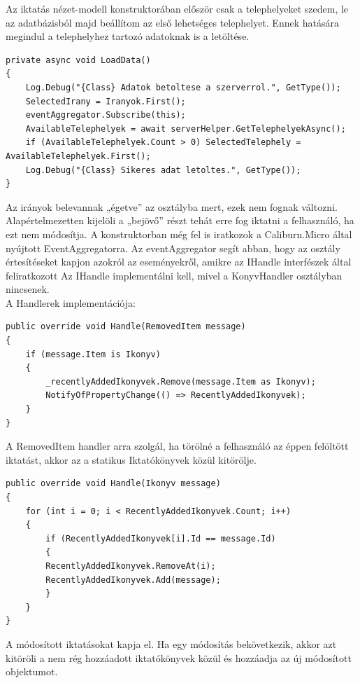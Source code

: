\documentclass[
]{thesis-ekf}
\theoremstyle{definition}
\theoremstyle{remark}
\begin{document}
Az iktatás nézet-modell konstruktorában először csak a telephelyeket szedem, le az adatbázisból majd beállítom az első lehetséges telephelyet. Ennek hatására megindul a telephelyhez tartozó adatoknak is a letöltése. 
\begin{lstlisting}[showstringspaces=false,caption={Iktatáshoz szükséges adatok letöltése.},captionpos=b]
private async void LoadData()
{
	Log.Debug("{Class} Adatok betoltese a szerverrol.", GetType());
	SelectedIrany = Iranyok.First();
	eventAggregator.Subscribe(this);
	AvailableTelephelyek = await serverHelper.GetTelephelyekAsync();
	if (AvailableTelephelyek.Count > 0) SelectedTelephely = AvailableTelephelyek.First();
	Log.Debug("{Class} Sikeres adat letoltes.", GetType());
}
\end{lstlisting}
Az irányok belevannak „égetve” az osztályba mert, ezek nem fognak változni. Alapértelmezetten kijelöli a „bejövő” részt tehát erre fog iktatni a felhasználó, ha ezt nem módosítja. A konstruktorban még fel is iratkozok a Caliburn.Micro által nyújtott EventAggregatorra. Az eventAggregator segít abban, hogy az osztály értesítéseket kapjon azokról az eseményekről, amikre az IHandle interfészek által feliratkozott Az IHandle implementálni kell, mivel a KonyvHandler osztályban nincsenek.\\
A Handlerek implementációja:
\begin{lstlisting}[caption={Iktatás törlése a táblából.},captionpos=b]
public override void Handle(RemovedItem message)
{
	if (message.Item is Ikonyv)
	{
		_recentlyAddedIkonyvek.Remove(message.Item as Ikonyv);
		NotifyOfPropertyChange(() => RecentlyAddedIkonyvek);
	}
}
\end{lstlisting}
A RemovedItem handler arra szolgál, ha törölné a felhasználó az éppen felöltött iktatást, akkor az a statikus Iktatókönyvek közül kitörölje. 
\begin{lstlisting}[caption={Iktatás módosítása a táblában.},captionpos=b]
public override void Handle(Ikonyv message)
{
	for (int i = 0; i < RecentlyAddedIkonyvek.Count; i++)
	{
		if (RecentlyAddedIkonyvek[i].Id == message.Id)
		{
		RecentlyAddedIkonyvek.RemoveAt(i);
		RecentlyAddedIkonyvek.Add(message);
		}
	}
}

\end{lstlisting}
A módosított iktatásokat kapja el. Ha egy módosítás bekövetkezik, akkor azt kitöröli a nem rég hozzáadott iktatókönyvek közül és hozzáadja az új módosított objektumot.
\end{document}
